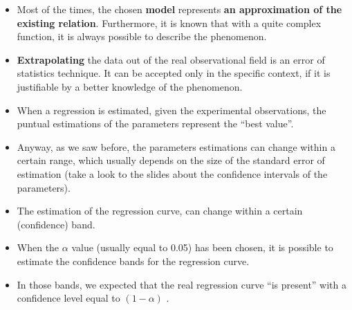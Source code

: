 \begin{frame}
  \vspace*{.5cm}
  \begin{itemize}
    \item Most of the times, the chosen \textbf{model} represents \textbf{an approximation of the existing relation}. Furthermore, it is known that with a quite complex function, it is always possible to describe the phenomenon.
    \vspace*{.5cm}
    \item \textbf{Extrapolating} the data out of the real observational field is an error of statistics technique. It can be accepted only in the specific context, if it is justifiable by a better knowledge of the phenomenon.
  \end{itemize}
\end{frame}


\begin{frame}
  \vspace*{.25cm}
  \begin{itemize}
    \item When a regression is estimated, given the experimental observations, the puntual estimations of the parameters represent the ``best value''. 
    \item Anyway, as we saw before, the parameters estimations can change within a certain range, which usually depends on the size of the standard error of estimation (take a look to the slides about the confidence intervals of the parameters).
    \item The estimation of the regression curve, can change within a certain (confidence) band.
    \item When the $\alpha$ value (usually equal to 0.05) has been chosen, it is possible to estimate the confidence bands for the regression curve.
    \item In those bands, we expected that the real regression curve ``is present'' with a confidence level equal to $(1-\alpha)$ .
  \end{itemize}
\end{frame}

